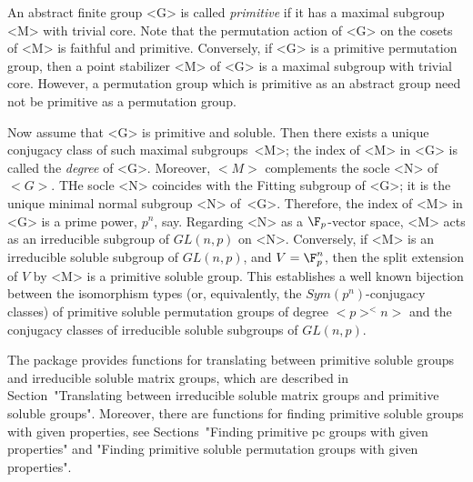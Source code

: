 


An abstract finite group <G> is called {\it primitive} if it has a maximal 
subgroup <M> with trivial core. Note that the permutation action of <G> on the 
cosets of <M> is faithful and primitive. Conversely, if <G> is a primitive 
permutation group, then a point stabilizer <M> of <G> is a maximal
subgroup with trivial core. However, a permutation group which is primitive 
as an abstract group need not be primitive as a permutation group. 

Now assume that <G> is primitive and soluble. Then there exists a unique conjugacy class of 
such maximal subgroups~<M>; the index of <M> in <G> is called the {\it degree} of <G>.
Moreover, $<M>$ 
complements the socle <N> of $<G>$. THe socle <N> coincides with the Fitting 
subgroup of <G>; it is the unique minimal normal subgroup <N> of~<G>. Therefore, 
the index of <M> in <G> is a prime power, $p^n$, say.
Regarding <N> as a $\F_p$-vector space, <M> acts as an irreducible subgroup of $GL(n,p)$ on <N>.
Conversely, if <M> is an irreducible soluble subgroup of $GL(n,p)$, and $V = \F_p^n$, then the
split extension of $V$ by <M> is a primitive soluble group. 
This establishes a well known
bijection between the isomorphism types (or, equivalently, the 
$Sym(p^n)$-conjugacy classes) of primitive soluble permutation groups of degree
$<p>^<n>$ and the conjugacy classes of irreducible soluble subgroups of $GL(n, p)$.

The {\IRREDSOL} package provides functions for translating between primitive soluble 
groups and irreducible soluble matrix groups, which are
described in Section~"Translating between irreducible soluble matrix groups 
and primitive soluble groups". Moreover, there are functions for finding
primitive soluble groups with given properties, see Sections~"Finding primitive 
pc groups
with given properties" and "Finding primitive soluble permutation groups
with given properties".



